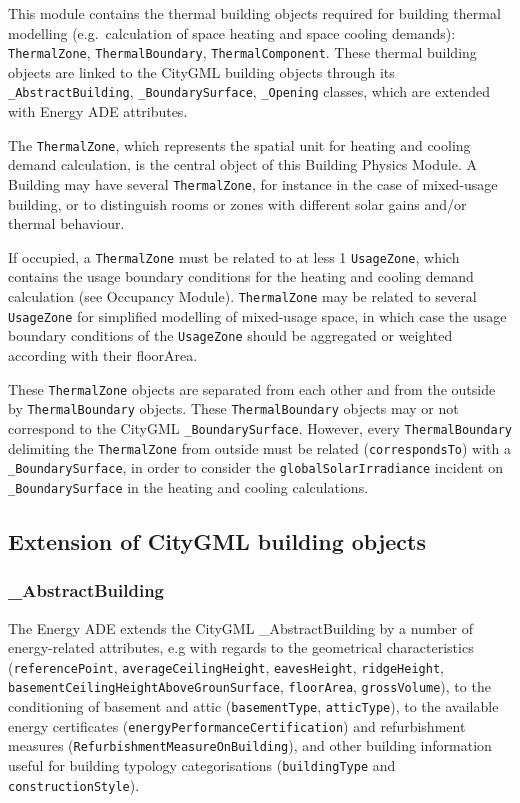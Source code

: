 \documentclass[a4paper,12pt]{article}
\begin{document}
This module contains the thermal building objects required for building
thermal modelling (e.g.~calculation of space heating and space cooling
demands): \lstinline!ThermalZone!, \lstinline!ThermalBoundary!,
\lstinline!ThermalComponent!. These thermal building objects are linked
to the CityGML building objects through its
\lstinline!_AbstractBuilding!, \lstinline!_BoundarySurface!,
\lstinline!_Opening! classes, which are extended with Energy ADE
attributes.

The \lstinline!ThermalZone!, which represents the spatial unit for
heating and cooling demand calculation, is the central object of this
Building Physics Module. A Building may have several
\lstinline!ThermalZone!, for instance in the case of mixed-usage
building, or to distinguish rooms or zones with different solar gains
and/or thermal behaviour.

If occupied, a \lstinline!ThermalZone! must be related to at less 1
\lstinline!UsageZone!, which contains the usage boundary conditions for
the heating and cooling demand calculation (see Occupancy Module).
\lstinline!ThermalZone! may be related to several \lstinline!UsageZone!
for simplified modelling of mixed-usage space, in which case the usage
boundary conditions of the \lstinline!UsageZone! should be aggregated or
weighted according with their floorArea.

These \lstinline!ThermalZone! objects are separated from each other and
from the outside by \lstinline!ThermalBoundary! objects. These
\lstinline!ThermalBoundary! objects may or not correspond to the CityGML
\lstinline!_BoundarySurface!. However, every \lstinline!ThermalBoundary!
delimiting the \lstinline!ThermalZone! from outside must be related
(\lstinline!correspondsTo!) with a \lstinline!_BoundarySurface!, in
order to consider the \lstinline!globalSolarIrradiance! incident on
\lstinline!_BoundarySurface! in the heating and cooling calculations.

\subsection{Extension of CityGML building
objects}\label{extension-of-citygml-building-objects}

\subsubsection{\_AbstractBuilding}\label{abstractbuilding}

The Energy ADE extends the CityGML \_AbstractBuilding by a number of
energy-related attributes, e.g with regards to the geometrical
characteristics (\lstinline!referencePoint!,
\lstinline!averageCeilingHeight!, \lstinline!eavesHeight!,
\lstinline!ridgeHeight!,
\lstinline!basementCeilingHeightAboveGrounSurface!,
\lstinline!floorArea!, \lstinline!grossVolume!), to the conditioning of
basement and attic (\lstinline!basementType!, \lstinline!atticType!), to
the available energy certificates
(\lstinline!energyPerformanceCertification!) and refurbishment measures
(\lstinline!RefurbishmentMeasureOnBuilding!), and other building
information useful for building typology categorisations
(\lstinline!buildingType! and \lstinline!constructionStyle!).
\end{document}
